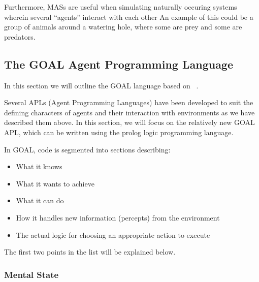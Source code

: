 Furthermore, MASs are useful when simulating naturally occuring systems
wherein several ``agents'' interact with each other An example of
this could be a group of animals around a watering hole, where some
are prey and some are predators.


\subsection{The GOAL Agent Programming Language}

In this section we will outline the GOAL language based on ~\cite{Hindriks06}.

Several APLs (Agent Programming Languages) have been developed to
suit the defining characters of agents and their interaction with
environments as we have described them above. In this section, we
will focus on the relatively new GOAL APL, which can be written using
the prolog logic programming language.

In GOAL, code is segmented into sections describing:
\begin{itemize}
\item What it knows
\item What it wants to achieve
\item What it can do
\item How it handles new information (percepts) from the environment
\item The actual logic for choosing an appropriate action to execute
\end{itemize}
The first two points in the list will be explained below. 


\subsubsection*{Mental State}

